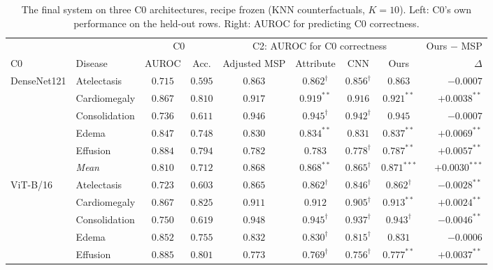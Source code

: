\begin{table}[htbp]
\centering
\small
\caption{The final system on three C0 architectures, recipe frozen (KNN counterfactuals, $K=10$). Left: C0's own performance on the held-out rows. Right: AUROC for predicting C0 correctness.}
\label{tab:c0_arch}
\begin{threeparttable}
\begin{tabular}{ll|cc|c|ccc|r}
\toprule
\multicolumn{2}{c|}{} & \multicolumn{2}{c|}{C0} & \multicolumn{4}{c|}{C2: AUROC for C0 correctness} & \multicolumn{1}{c}{Ours $-$ MSP} \\
\cmidrule(lr){3-4} \cmidrule(lr){5-8} \cmidrule(l){9-9}
C0 & Disease & AUROC & Acc. & Adjusted MSP & Attribute & CNN & Ours & $\Delta$ \\
\midrule
\multirow{6}{*}{DenseNet121} & Atelectasis & $0.715$ & $0.595$ & $\mathbf{0.863}$ & $0.862^{\dagger}$ & $0.856^{\dagger}$ & $0.863$ & $-0.0007$ \\
 & Cardiomegaly & $0.867$ & $0.810$ & $0.917$ & $0.919^{**}$ & $0.916$ & $\mathbf{0.921}^{**}$ & $+0.0038^{**}$ \\
 & Consolidation & $0.736$ & $0.611$ & $\mathbf{0.946}$ & $0.945^{\dagger}$ & $0.942^{\dagger}$ & $0.945$ & $-0.0007$ \\
 & Edema & $0.847$ & $0.748$ & $0.830$ & $0.834^{**}$ & $0.831$ & $\mathbf{0.837}^{**}$ & $+0.0069^{**}$ \\
 & Effusion & $0.884$ & $0.794$ & $0.782$ & $0.783$ & $0.778^{\dagger}$ & $\mathbf{0.787}^{**}$ & $+0.0057^{**}$ \\
\cmidrule(l){2-9}
 & \textit{Mean} & $0.810$ & $0.712$ & $0.868$ & $0.868^{**}$ & $0.865^{\dagger}$ & $\mathbf{0.871}^{***}$ & $+0.0030^{***}$ \\
\midrule
\multirow{6}{*}{ViT-B/16} & Atelectasis & $0.723$ & $0.603$ & $\mathbf{0.865}$ & $0.862^{\dagger}$ & $0.846^{\dagger}$ & $0.862^{\dagger}$ & $-0.0028^{**}$ \\
 & Cardiomegaly & $0.867$ & $0.825$ & $0.911$ & $0.912$ & $0.905^{\dagger}$ & $\mathbf{0.913}^{**}$ & $+0.0024^{**}$ \\
 & Consolidation & $0.750$ & $0.619$ & $\mathbf{0.948}$ & $0.945^{\dagger}$ & $0.937^{\dagger}$ & $0.943^{\dagger}$ & $-0.0046^{**}$ \\
 & Edema & $0.852$ & $0.755$ & $\mathbf{0.832}$ & $0.830^{\dagger}$ & $0.815^{\dagger}$ & $0.831$ & $-0.0006$ \\
 & Effusion & $0.885$ & $0.801$ & $0.773$ & $0.769^{\dagger}$ & $0.756^{\dagger}$ & $\mathbf{0.777}^{**}$ & $+0.0037^{**}$ \\

\end{tabular}
\end{threeparttable}
\end{table}
